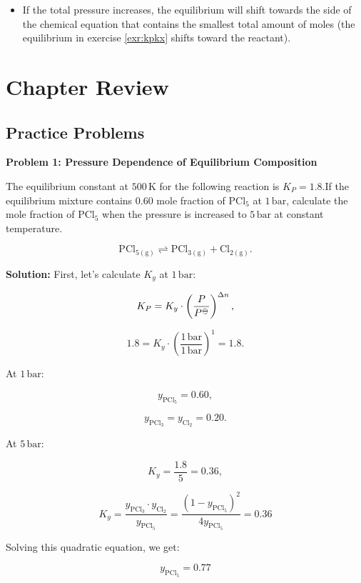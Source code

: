 \documentclass[
  9pt,
]{extbook}
\providecommand{\tightlist}{%
  \setlength{\itemsep}{0pt}\setlength{\parskip}{0pt}}
\theoremstyle{definition}
\theoremstyle{definition}
\theoremstyle{definition}
\theoremstyle{remark}
\begin{document}
\begin{itemize}
\tightlist
\item
  If the total pressure increases, the equilibrium will shift towards the side of the chemical equation that contains the smallest total amount of moles (the equilibrium in exercise \ref{exr:kpkx} shifts toward the reactant).
\end{itemize}

\hypertarget{rev10}{%
\section{Chapter Review}\label{rev10}}

\hypertarget{exer10}{%
\subsection{Practice Problems}\label{exer10}}

\textbf{Problem 1: Pressure Dependence of Equilibrium Composition}

The equilibrium constant at \(500\,\text{K}\) for the following reaction is \(K_P = 1.8\).If the equilibrium mixture contains \(0.60\) mole fraction of \(\text{PCl}_5\) at \(1\,\text{bar}\), calculate the mole fraction of \(\text{PCl}_5\) when the pressure is increased to \(5\,\text{bar}\) at constant temperature.

\[\text{PCl}_{5(\text{g})} \rightleftharpoons \text{PCl}_{3(\text{g})} + \text{Cl}_{2(\text{g})}.\]

\textbf{Solution:} First, let's calculate \(K_y\) at \(1\,\text{bar}\):

\[K_P = K_y \cdot \left(\frac{P}{P^{{-\kern-6pt{\ominus}\kern-6pt-}}}\right)^{\Delta n},\]

\[1.8 = K_y \cdot \left(\frac{1\,\text{bar}}{1\,\text{bar}}\right)^1 = 1.8.\]

At \(1\,\text{bar}\):

\[y_{\text{PCl}_5} = 0.60,\]

\[y_{\text{PCl}_3} = y_{\text{Cl}_2} = 0.20.\]

At \(5\,\text{bar}\):

\[K_y = \frac{1.8}{5} = 0.36,\]

\[K_y = \frac{y_{\text{PCl}_3} \cdot y_{\text{Cl}_2}}{y_{\text{PCl}_5}} = \frac{(1-y_{\text{PCl}_5})^2}{4y_{\text{PCl}_5}} = 0.36\]

Solving this quadratic equation, we get:

\[y_{\text{PCl}_5} = 0.77\]
\end{document}
